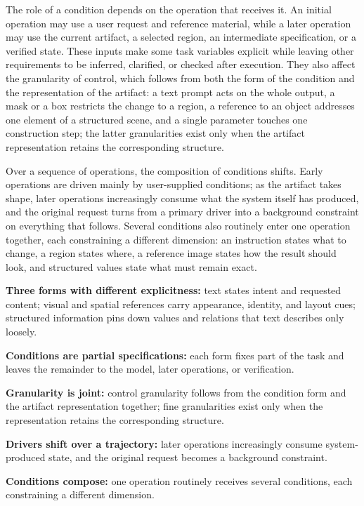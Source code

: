 The role of a condition depends on the operation that receives it. An initial operation may use a user request and reference material, while a later operation may use the current artifact, a selected region, an intermediate specification, or a verified state. These inputs make some task variables explicit while leaving other requirements to be inferred, clarified, or checked after execution. They also affect the granularity of control, which follows from both the form of the condition and the representation of the artifact: a text prompt acts on the whole output, a mask or a box restricts the change to a region, a reference to an object addresses one element of a structured scene, and a single parameter touches one construction step; the latter granularities exist only when the artifact representation retains the corresponding structure.

Over a sequence of operations, the composition of conditions shifts. Early operations are driven mainly by user-supplied conditions; as the artifact takes shape, later operations increasingly consume what the system itself has produced, and the original request turns from a primary driver into a background constraint on everything that follows. Several conditions also routinely enter one operation together, each constraining a different dimension: an instruction states what to change, a region states where, a reference image states how the result should look, and structured values state what must remain exact.

\begin{keytakeaway}
\begin{keypoints}
  \item \textbf{Three forms with different explicitness:} text states intent and requested content; visual and spatial references carry appearance, identity, and layout cues; structured information pins down values and relations that text describes only loosely.
  \item \textbf{Conditions are partial specifications:} each form fixes part of the task and leaves the remainder to the model, later operations, or verification.
  \item \textbf{Granularity is joint:} control granularity follows from the condition form and the artifact representation together; fine granularities exist only when the representation retains the corresponding structure.
  \item \textbf{Drivers shift over a trajectory:} later operations increasingly consume system-produced state, and the original request becomes a background constraint.
  \item \textbf{Conditions compose:} one operation routinely receives several conditions, each constraining a different dimension.
\end{keypoints}
\end{keytakeaway}


